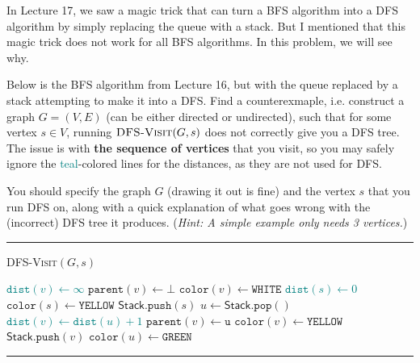 \documentclass[11pt]{article}
\begin{document}
    \newpage
    \begin{tcolorbox}[title={Problem 2 (Failed Magic, 20 pts)}] \setlength\parindent{1em}
         In Lecture 17, we saw a magic trick that can turn a BFS algorithm into a DFS algorithm by simply replacing the queue with a stack. But I mentioned that this magic trick does not work for all BFS algorithms. In this problem, we will see why.

         Below is the BFS algorithm from Lecture 16, but with the queue replaced by a stack attempting to make it into a DFS. Find a counterexmaple, i.e. construct a graph $G=(V,E)$ (can be either directed or undirected), such that for some vertex $s\in V$, running $\textsc{DFS-Visit}(G, s)$ does not correctly give you a DFS tree. The issue is with \textbf{the sequence of vertices} that you visit, so you may safely ignore the \textcolor{teal}{teal}-colored lines for the distances, as they are not used for DFS.

         You should specify the graph $G$ (drawing it out is fine) and the vertex $s$ that you run DFS on, along with a quick explanation of what goes wrong with the (incorrect) DFS tree it produces. (\emph{Hint: A simple example only needs 3 vertices.})

        
        \par\noindent\rule{\textwidth}{0.4pt}
        \smallskip        
        \textsc{DFS-Visit}$(G,s)$
        \begin{algorithmic}[1]
                \STATE \textcolor{teal}{$\texttt{dist}(v)\gets \infty$}
                \STATE $\texttt{parent}(v)\gets \bot$
                \STATE $\texttt{color}(v)\gets \texttt{WHITE}$
            \ENDFOR
            \STATE \textcolor{teal}{$\texttt{dist}(s)\gets 0$}
            \STATE $\texttt{color}(s)\gets \texttt{YELLOW}$
            \STATE $\textsf{Stack}.\texttt{push}(s)$
                \STATE $u\gets \textsf{Stack}.\texttt{pop}()$
                    \STATE \textcolor{teal}{$\texttt{dist}(v)\gets \texttt{dist}(u)+1$}
                    \STATE $\texttt{parent}(v)\gets \texttt{u}$
            \STATE $\texttt{color}(v)\gets \texttt{YELLOW}$
            \STATE $\textsf{Stack}.\texttt{push}(v)$
                \ENDIF
                \ENDFOR
                \STATE $\texttt{color}(u)\gets \texttt{GREEN}$
            \ENDWHILE
        \end{algorithmic}
        \vspace{-2mm}
        \par\noindent\rule{\textwidth}{0.4pt}
    \end{tcolorbox}
\end{document}

